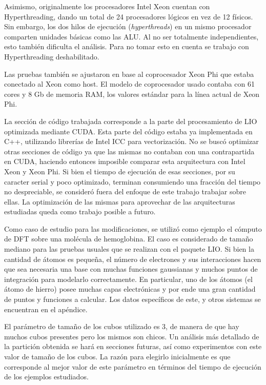 Asimismo, originalmente los procesadores Intel Xeon cuentan con Hyperthreading,
dando un total de 24 procesadores l\'ogicos en vez de 12 f\'isicos.
Sin embargo, los dos hilos de ejecuci\'on (\textit{hyperthreads}) en un mismo
procesador comparten unidades b\'asicas como las ALU. Al no ser totalmente
independientes, esto tambi\'en dificulta el an\'alisis. Para no tomar esto en
cuenta se trabajo con Hyperthreading deshabilitado.

Las pruebas tambi\'en se ajustaron en base al coprocesador Xeon Phi que estaba
conectado al Xeon como host. El modelo de coprocesador usado contaba con 61
cores y 8 Gb de memoria RAM, los valores est\'andar para la l\'inea actual de
Xeon Phi.

La secci\'on de c\'odigo trabajada corresponde a la parte del procesamiento
de LIO optimizada mediante CUDA. Esta parte del c\'odigo estaba ya implementada
en C++, utilizando librer\'ias de Intel ICC para vectorizaci\'on. No se busc\'o
optimizar otras secciones de c\'odigo ya que las mismas no contaban con una
contrapartida en CUDA, haciendo entonces imposible comparar esta arquitectura con
Intel Xeon y Xeon Phi. Si bien el tiempo de ejecuci\'on de esas secciones, por su
caracter serial y poco optimizado, terminan consumiendo una fracci\'on del tiempo
no despreciable, se consider\'o fuera del enfoque de este trabajo trabajar sobre
ellas. La optimizaci\'on de las mismas para aprovechar de las arquitecturas
estudiadas queda como trabajo posible a futuro.

Como caso de estudio para las modificaciones, se utiliz\'o como ejemplo el c\'omputo
de DFT sobre una mol\'ecula de hemoglobina. El caso es considerado de tama\~no
mediano para las pruebas usuales que se realizan con el paquete LIO. Si bien la
cantidad de \'atomos es peque\~na, el n\'umero de electrones y sus interacciones
hacen que sea necesaria una base con muchas funciones gaussianas y muchos puntos de integraci\'on para
modelarlo correctamente. En particular, uno de los \'atomos (el \'atomo de hierro)
posee muchas capas electr\'onicas y por ende una gran cantidad de puntos y
funciones a calcular. Los datos espec\'ificos de este, y otros sistemas
se encuentran en el ap\'endice.

El par\'ametro de tama\~no de los cubos utilizado es 3, de manera de que hay muchos
cubos presentes pero los mismos son chicos. Un an\'alisis m\'as detallado de la
partici\'on obtenida se har\'a en secciones futuras, as\'i como experimentos con
este valor de tama\~no de los cubos. La raz\'on para elegirlo inicialmente es que
corresponde al mejor valor de este par\'ametro en t\'erminos del tiempo de
ejecuci\'on de los ejemplos estudiados.


